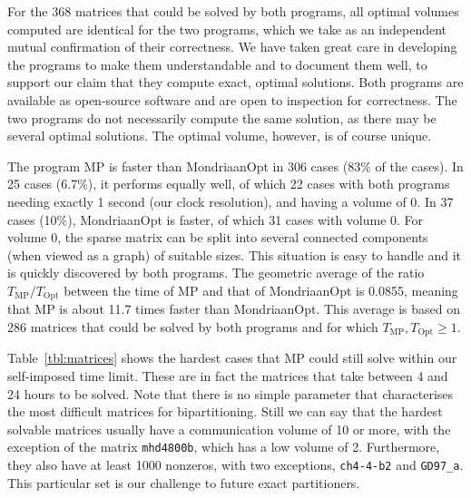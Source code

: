 For the 368 matrices that could be solved by both programs, all optimal volumes computed are identical
for the two programs,
which we take as an independent mutual confirmation of their correctness. We have taken great care
in developing the programs to make them understandable and to document them well,
to support our claim that they compute exact, optimal solutions.
Both programs are available as open-source software
and are open to inspection for correctness.
The two programs do not necessarily compute the same solution, as there may be several
optimal solutions. The optimal volume, however, is of course unique.

The program MP is faster than MondriaanOpt in 306 cases (83\% of the cases).
In 25 cases (6.7\%), it performs equally well, of which 22 cases with both programs needing exactly
1 second (our clock resolution), and having a volume of 0.
In 37 cases (10\%), MondriaanOpt is faster, of which 31 cases with volume 0.
For volume 0, the sparse matrix can be split into several connected components
(when viewed as a graph) of suitable sizes. This situation is easy to handle
and it is quickly discovered by both programs.
The geometric average of the ratio $T_{\mathrm{MP}} / T_{\mathrm{Opt}}$
between the time of MP and that of MondriaanOpt is 0.0855, meaning that MP is about 11.7 times faster
than MondriaanOpt.
This average is based on 286 matrices that could be solved by both programs and for which $T_{\mathrm{MP}}, T_{\mathrm{Opt}}  \geq 1$.

Table~\ref{tbl:matrices} shows the hardest cases that MP could still
solve within our self-imposed time limit.
These are in fact the matrices that take between 4 and 24 hours to be solved.
Note that there is no simple parameter that characterises the most difficult  matrices
for bipartitioning. Still we can say 
that the hardest solvable matrices usually have a communication volume of 10 or more,
with the exception
of the matrix \texttt{mhd4800b}, which has a low volume of 2.
Furthermore, they also have at least 1000 nonzeros, with two exceptions, \texttt{ch4-4-b2}
and \texttt{GD97\_a}. This particular set is our challenge to future exact partitioners.


